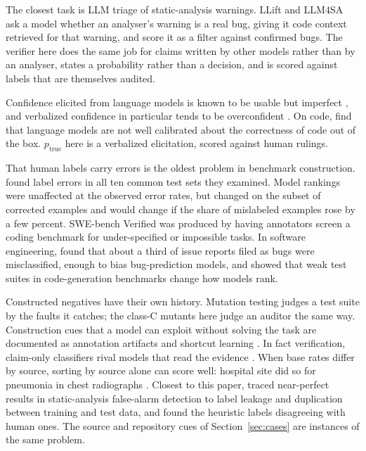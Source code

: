 \documentclass[11pt]{article}
\begin{document}
The closest task is LLM triage of static-analysis warnings. LLift \citep{li2024llift} and LLM4SA \citep{wen2024llm4sa} ask a model whether an analyser's warning is a real bug, giving it code context retrieved for that warning, and score it as a filter against confirmed bugs. The verifier here does the same job for claims written by other models rather than by an analyser, states a probability rather than a decision, and is scored against labels that are themselves audited.

Confidence elicited from language models is known to be usable but imperfect \citep{kadavath2022know,tian2023calibration}, and verbalized confidence in particular tends to be overconfident \citep{xiong2024uncertainty}. On code, \citet{spiess2025calibration} find that language models are not well calibrated about the correctness of code out of the box. $p_{\text{true}}$ here is a verbalized elicitation, scored against human rulings.

That human labels carry errors is the oldest problem in benchmark construction. \citet{northcutt2021label} found label errors in all ten common test sets they examined. Model rankings were unaffected at the observed error rates, but changed on the subset of corrected examples and would change if the share of mislabeled examples rose by a few percent. SWE-bench Verified \citep{openai2024swebenchverified} was produced by having annotators screen a coding benchmark for under-specified or impossible tasks. In software engineering, \citet{herzig2013notabug} found that about a third of issue reports filed as bugs were misclassified, enough to bias bug-prediction models, and \citet{liu2023evalplus} showed that weak test suites in code-generation benchmarks change how models rank.

Constructed negatives have their own history. Mutation testing \citep{demillo1978} judges a test suite by the faults it catches; the class-C mutants here judge an auditor the same way. Construction cues that a model can exploit without solving the task are documented as annotation artifacts \citep{gururangan2018} and shortcut learning \citep{geirhos2020}. In fact verification, claim-only classifiers rival models that read the evidence \citep{schuster2019debiasing}. When base rates differ by source, sorting by source alone can score well: hospital site did so for pneumonia in chest radiographs \citep{zech2018pneumonia}. Closest to this paper, \citet{kang2022falsealarms} traced near-perfect results in static-analysis false-alarm detection to label leakage and duplication between training and test data, and found the heuristic labels disagreeing with human ones. The source and repository cues of Section~\ref{sec:cases} are instances of the same problem.
\end{document}
